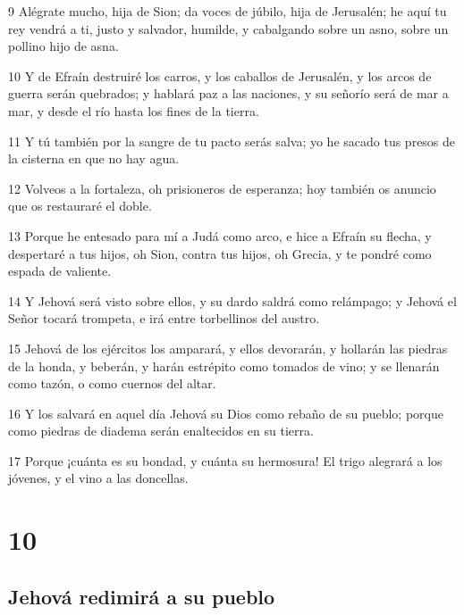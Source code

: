 \par 9 Alégrate mucho, hija de Sion; da voces de júbilo, hija de Jerusalén; he aquí tu rey vendrá a ti, justo y salvador, humilde, y cabalgando sobre un asno, sobre un pollino hijo de asna. 
\par 10 Y de Efraín destruiré los carros, y los caballos de Jerusalén, y los arcos de guerra serán quebrados; y hablará paz a las naciones, y su señorío será de mar a mar, y desde el río hasta los fines de la tierra. 
\par 11 Y tú también por la sangre de tu pacto serás salva; yo he sacado tus presos de la cisterna en que no hay agua.
\par 12 Volveos a la fortaleza, oh prisioneros de esperanza; hoy también os anuncio que os restauraré el doble.
\par 13 Porque he entesado para mí a Judá como arco, e hice a Efraín su flecha, y despertaré a tus hijos, oh Sion, contra tus hijos, oh Grecia, y te pondré como espada de valiente.
\par 14 Y Jehová será visto sobre ellos, y su dardo saldrá como relámpago; y Jehová el Señor tocará trompeta, e irá entre torbellinos del austro.
\par 15 Jehová de los ejércitos los amparará, y ellos devorarán, y hollarán las piedras de la honda, y beberán, y harán estrépito como tomados de vino; y se llenarán como tazón, o como cuernos del altar.
\par 16 Y los salvará en aquel día Jehová su Dios como rebaño de su pueblo; porque como piedras de diadema serán enaltecidos en su tierra.
\par 17 Porque ¡cuánta es su bondad, y cuánta su hermosura! El trigo alegrará a los jóvenes, y el vino a las doncellas.

\chapter{10}

\section*{Jehová redimirá a su pueblo}

